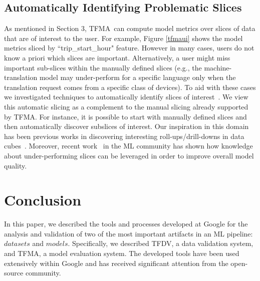 \documentclass[11pt]{article}
\newcommand{\tfdv}{{\sf TFDV}}
\newcommand{\tfma}{{\sf TFMA}}
\begin{document}
\subsection{Automatically Identifying Problematic Slices}
As mentioned in Section 3, \tfma\ can compute model metrics over slices of data that are of interest to the user. For example, Figure \ref{tfmaui} shows the model metrics sliced by ``trip\_start\_hour" feature. However in many cases, users do not know a priori which slices are important. Alternatively, a user might miss important sub-slices within the manually defined slices (e.g., the machine-translation model may under-perform for a specific language only when the translation request comes from a specific class of devices). To aid with these cases we investigated techniques to automatically identify slices of interest~\cite{slicefinder}. We view this automatic slicing as a complement to the manual slicing already supported by \tfma. For instance, it is possible to start with manually defined slices and then automatically discover subslices of interest. Our inspiration in this domain has been previous works in discovering interesting roll-ups/drill-downs in data cubes~\cite{sarawagi2000user, sathe2001intelligent, 10.14778/2733004.2733035}. Moreover, recent work~\cite{NIPS2019_9137} in the ML community has shown how knowledge about under-performing slices can be leveraged in order to improve overall model quality.

\newpage
\section{Conclusion}
In this paper, we described the tools and processes developed at Google for the analysis and validation of two of the most important artifacts in an ML pipeline: $datasets$ and $models$. Specifically, we described \tfdv, a data validation system, and \tfma, a model evaluation system. The developed tools have been used extensively within Google and has received significant attention from the open-source community.  
\end{document}
